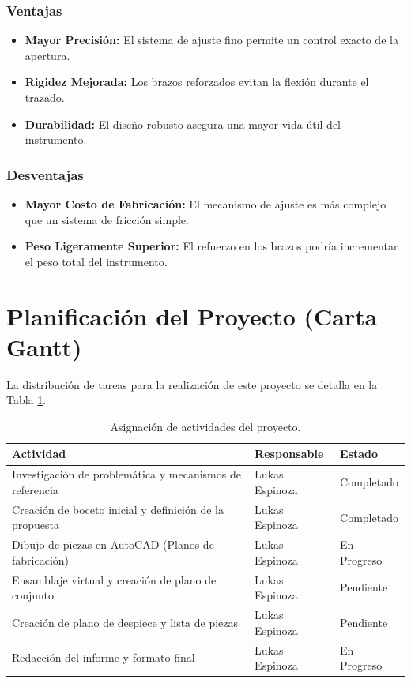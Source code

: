 \documentclass[11pt, a4paper]{article}
\begin{document}
\subsubsection{Ventajas}
\begin{itemize}
    \item \textbf{Mayor Precisión:} El sistema de ajuste fino permite un control exacto de la apertura.
    \item \textbf{Rigidez Mejorada:} Los brazos reforzados evitan la flexión durante el trazado.
    \item \textbf{Durabilidad:} El diseño robusto asegura una mayor vida útil del instrumento.
\end{itemize}

\subsubsection{Desventajas}
\begin{itemize}
    \item \textbf{Mayor Costo de Fabricación:} El mecanismo de ajuste es más complejo que un sistema de fricción simple.
    \item \textbf{Peso Ligeramente Superior:} El refuerzo en los brazos podría incrementar el peso total del instrumento.
\end{itemize}

\section{Planificación del Proyecto (Carta Gantt)}
La distribución de tareas para la realización de este proyecto se detalla en la Tabla \ref{tab:gantt}.

\begin{table}[H]
    \centering
    \caption{Asignación de actividades del proyecto.}
    \label{tab:gantt}
    \begin{tabular}{@{}lll@{}}
        \toprule
        \textbf{Actividad} & \textbf{Responsable} & \textbf{Estado} \\
        \midrule
        Investigación de problemática y mecanismos de referencia & Lukas Espinoza & Completado \\
        Creación de boceto inicial y definición de la propuesta & Lukas Espinoza & Completado \\
        Dibujo de piezas en AutoCAD (Planos de fabricación) & Lukas Espinoza & En Progreso \\
        Ensamblaje virtual y creación de plano de conjunto & Lukas Espinoza & Pendiente \\
        Creación de plano de despiece y lista de piezas & Lukas Espinoza & Pendiente \\
        Redacción del informe y formato final & Lukas Espinoza & En Progreso \\
        \bottomrule
    \end{tabular}
\end{table}
\end{document}
